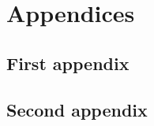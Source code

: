 \newpage


\newpage

\appendix
\section*{Appendices}
\renewcommand{\thesubsection}{\Alph{subsection}}
\subsection{First appendix}
\subsection{Second appendix}



